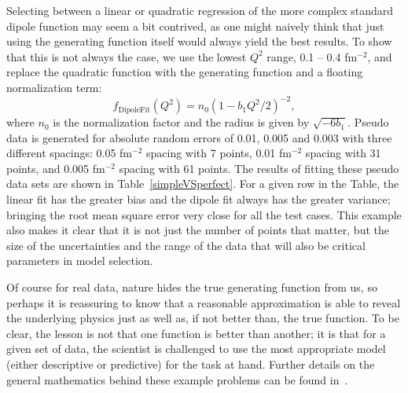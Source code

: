 \documentclass[10pt,superscriptaddress,aps,prc,twocolumn]{revtex4-1}
\begin{document}
Selecting between a linear or quadratic regression of the more complex standard dipole function may seem 
a bit contrived, as one might naively think that just using the generating function itself would always yield the
best results.   To show that this is not always the case, 
we use the lowest $Q^2$ range, 0.1 -- 0.4 fm$^{-2}$, and replace the quadratic function 
with the generating function and a floating normalization term:
\begin{equation}
\label{eq:fitdipole}
f_{{\mathrm{Dipole Fit}}}(Q^2) =  n_0 ( 1 - b_1 Q^2 / 2)^{-2},
\end{equation}
where $n_0$ is the normalization factor and the radius is given by $\sqrt{-6 b_1}$.
Pseudo data is generated for absolute random errors of 0.01, 0.005 and 0.003 
with three different spacings: 
0.05 fm$^{-2}$ spacing with 7 points, 0.01 fm$^{-2}$ spacing with 31 points, and 
0.005 fm$^{-2}$ spacing with 61 points.       
The results of fitting these pseudo data sets are shown in Table~\ref{simpleVSperfect}.    
For a given row in the Table, the linear fit has the greater bias and the dipole fit always
has the greater variance; bringing the root mean square error very close for all the test cases.   
This example also makes it clear that it is not just the number of points that matter, 
but the size of the uncertainties and the range of the data that will also be critical parameters
in model selection.

Of course for real data, nature hides the true generating function from us, so perhaps it is reassuring to know
that a reasonable approximation is able to reveal the underlying physics just as well as, if not better than, the
true function.   
To be clear, the lesson is not that one function is better than another; it is that for a given set of data,
the scientist is challenged to use the most appropriate model (either descriptive or predictive) for
the task at hand.   Further details on the general mathematics behind these example problems can be 
found in~\cite{Shmueli:2010}.    
\end{document}
